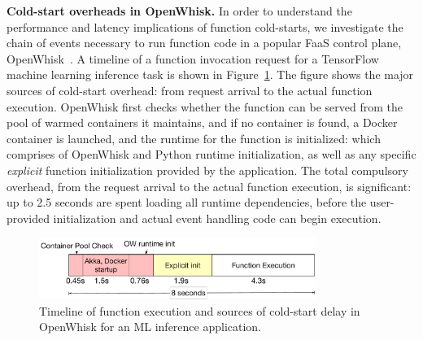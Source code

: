 \noindent \textbf{Cold-start overheads in OpenWhisk.} 
%
In order to understand the performance and latency implications of function cold-starts, we investigate the chain of events necessary to run function code in a popular FaaS control plane, OpenWhisk~\cite{openwhisk}.  
A timeline of a function invocation request for a TensorFlow machine learning inference task is shown in Figure~\ref{fig:timeline}. 
The figure shows the major sources of cold-start overhead: from request arrival to the actual function execution. 
OpenWhisk first checks whether the function can be served from the  pool of warmed containers it maintains, and if no container is found, a Docker container is launched, and the runtime for the function is initialized: which comprises of OpenWhisk and Python runtime initialization, as well as any specific \emph{explicit} function initialization provided by the application. 
The total compulsory overhead, from the request arrival to the actual function execution, is significant: up to 2.5 seconds are spent loading all runtime dependencies, before the user-provided initialization and actual event handling code can begin execution. 


\begin{figure}[t]
  \centering
  \includegraphics[width=0.8\textwidth]{faascache/faas-keepalive-20/figures/ow-timeline.pdf}
  \caption{Timeline of function execution and sources of cold-start delay in OpenWhisk for an ML inference application.}
  \label{fig:timeline}
\end{figure}


